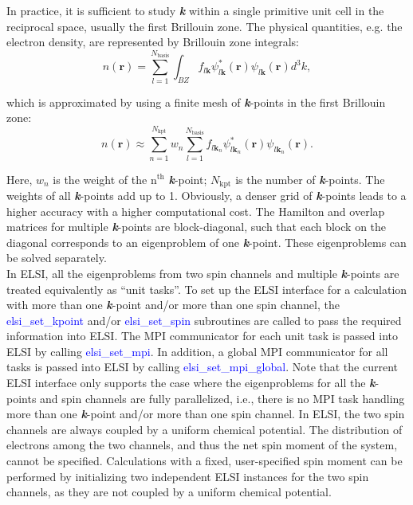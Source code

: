 \documentclass{report}
\begin{document}
In practice, it is sufficient to study \textbf{\textit{k}} within a single primitive unit cell in the reciprocal space, usually the first Brillouin zone.  The physical quantities, e.g. the electron density, are represented by Brillouin zone integrals:\\
\begin{equation}
\label{eq:bz}
n (\boldsymbol{r}) = \sum_{l=1}^{N_\text{basis}} \int_{BZ} f_{l \boldsymbol{k}} \psi_{l \boldsymbol{k}}^* (\boldsymbol{r}) \psi_{l \boldsymbol{k}} (\boldsymbol{r}) d^3 k ,
\end{equation}

which is approximated by using a finite mesh of \textbf{\textit{k}}-points in the first Brillouin zone:\\
\begin{equation}
\label{eq:k_grid}
n (\boldsymbol{r}) \approx \sum_{n=1}^{N_\text{kpt}} w_n
\sum_{l=1}^{N_\text{basis}} f_{l \boldsymbol{k}_n} \psi_{l \boldsymbol{k}_n}^* (\boldsymbol{r}) \psi_{l \boldsymbol{k}_n} (\boldsymbol{r}) .
\end{equation}

Here, $w_n$ is the weight of the n$^\text{th}$ \textbf{\textit{k}}-point; $N_\text{kpt}$ is the number of \textbf{\textit{k}}-points.  The weights of all \textbf{\textit{k}}-points add up to 1.  Obviously, a denser grid of \textbf{\textit{k}}-points leads to a higher accuracy with a higher computational cost.  The Hamilton and overlap matrices for multiple \textbf{\textit{k}}-points are block-diagonal, such that each block on the diagonal corresponds to an eigenproblem of one \textbf{\textit{k}}-point.  These eigenproblems can be solved separately.\\

In ELSI, all the eigenproblems from two spin channels and multiple \textbf{\textit{k}}-points are treated equivalently as ``unit tasks''.  To set up the ELSI interface for a calculation with more than one \textbf{\textit{k}}-point and/or more than one spin channel,  the \textcolor{blue}{elsi\_set\_kpoint} and/or \textcolor{blue}{elsi\_set\_spin} subroutines are called to pass the required information into ELSI.  The MPI communicator for each unit task is passed into ELSI by calling \textcolor{blue}{elsi\_set\_mpi}.  In addition, a global MPI communicator for all tasks is passed into ELSI by calling \textcolor{blue}{elsi\_set\_mpi\_global}.  Note that the current ELSI interface only supports the case where the eigenproblems for all the \textbf{\textit{k}}-points and spin channels are fully parallelized, i.e., there is no MPI task handling more than one \textbf{\textit{k}}-point and/or more than one spin channel.  In ELSI, the two spin channels are always coupled by a uniform chemical potential.  The distribution of electrons among the two channels, and thus the net spin moment of the system, cannot be specified.  Calculations with a fixed, user-specified spin moment can be performed by initializing two independent ELSI instances for the two spin channels, as they are not coupled by a uniform chemical potential.\\
\end{document}
